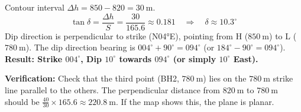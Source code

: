 \documentclass[11pt]{article}
\begin{document}
\begin{exoresolu}
Contour interval $\Delta h = 850 - 820 = 30\ \mathrm{m}$.
\[
\tan\delta = \frac{\Delta h}{S} = \frac{30}{165.6} \approx 0.181 \quad\Rightarrow\quad \delta \approx 10.3^\circ
\]
Dip direction is perpendicular to strike (N04°E), pointing from H ($850\ \mathrm{m}$) to L ($780\ \mathrm{m}$). The dip direction bearing is $004^\circ + 90^\circ = 094^\circ$ (or $184^\circ - 90^\circ = 094^\circ$).
\textbf{Result: Strike $004^\circ$, Dip $10^\circ$ towards $094^\circ$ (or simply $10^\circ$ East).}

\textbf{Verification:} Check that the third point (BH2, $780\ \mathrm{m}$) lies on the $780\ \mathrm{m}$ strike line parallel to the others. The perpendicular distance from $820\ \mathrm{m}$ to $780\ \mathrm{m}$ should be $\frac{40}{30} \times 165.6 \approx 220.8\ \mathrm{m}$. If the map shows this, the plane is planar.
\end{exoresolu}
\end{document}
